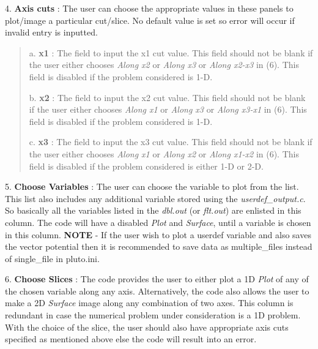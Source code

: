 \documentclass[letterpaper,10pt,english]{sphinxmanual}
\begin{document}
4. \textbf{Axis cuts} : The user can choose the appropriate values in these
panels to plot/image a particular cut/slice.
No default value is set so error will occur if invalid entry is inputted.
\begin{quote}

a. \textbf{x1} : The field to input the x1 cut value. This field should not be
blank if the user either chooses \emph{Along x2} or \emph{Along x3} or \emph{Along
x2-x3} in (6). This field is disabled if the problem considered is
1-D.

b. \textbf{x2} : The field to input the x2 cut value. This field should not
be blank if the user either chooses \emph{Along x1} or \emph{Along x3} or
\emph{Along x3-x1} in (6). This field is disabled if the
problem considered is 1-D.

c. \textbf{x3} : The field to input the x3 cut value. This field should not
be blank if the user either chooses \emph{Along x1} or \emph{Along x2} or
\emph{Along x1-x2} in (6).  This field is disabled if the
problem considered is either 1-D or 2-D.
\end{quote}

5. \textbf{Choose Variables} : The user can choose the variable to plot from the list. This list also includes any additional variable stored using the \emph{userdef\_output.c}. So basically all the variables
listed in the \emph{dbl.out} (or \emph{flt.out})  are enlisted in this column. The code will
have a disabled \emph{Plot} and  \emph{Surface}, until a variable is chosen in
this column. \textbf{NOTE} - If the user wish to plot a userdef variable
and also saves the vector potential then it is recommended to save
data as multiple\_files instead of single\_file in pluto.ini.

6. \textbf{Choose Slices} : The code provides the user to either plot a 1D \emph{Plot} of any of the chosen variable along any axis. Alternatively, the code also allows the user to make a 2D  \emph{Surface} image along
any combination of two axes. This column is redundant in case the
numerical problem under consideration is a 1D problem. With the choice
of the slice, the user should also have appropriate axis cuts
specified as mentioned above else the code will result into an error.
\end{document}
